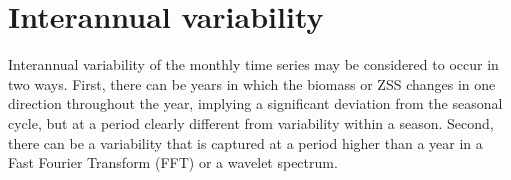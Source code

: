 \documentclass[authoryear,review,11pt]{elsarticle}
\begin{document}
\section{Interannual variability}
\label{sec:interannual}

Interannual variability of the monthly time series may be considered to occur in two ways.  First, there can be years in which the biomass or ZSS changes in one direction throughout the year, implying a significant deviation from the seasonal cycle, but at a period clearly different from variability within a season. Second, there can be a variability that is captured at a period higher than a year in a Fast Fourier Transform (FFT) or a wavelet spectrum. 

\end{document}
